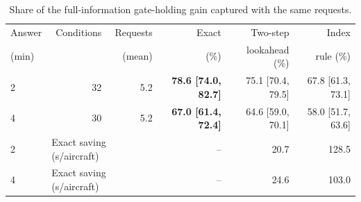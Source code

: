 \begin{table}[!htbp]
\centering
\caption{Share of the full-information gate-holding gain captured with the same requests.}
\label{tab:value_capture}
\tablefont
\begin{tabular}{@{}lrrrrr@{}}
\toprule
Answer & Conditions & Requests & Exact & Two-step & Index \\
(min) & & (mean) & (\%) & lookahead (\%) & rule (\%) \\
\midrule
2 & 32 & 5.2 & \textbf{78.6 [74.0, 82.7]} & 75.1 [70.4, 79.5] & 67.8 [61.3, 73.1] \\
4 & 30 & 5.2 & \textbf{67.0 [61.4, 72.4]} & 64.6 [59.0, 70.1] & 58.0 [51.7, 63.6] \\
\midrule
2 & \multicolumn{2}{l}{Exact saving (s/aircraft)} & -- & 20.7 & 128.5 \\
4 & \multicolumn{2}{l}{Exact saving (s/aircraft)} & -- & 24.6 & 103.0 \\
\bottomrule
\end{tabular}
\end{table}
